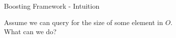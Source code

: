 \begin{frame}{Boosting Framework - Intuition}
    \begin{center}
        Assume we can query for the size of some element in $O$. 
        \\
        What can we do?
    \end{center}
\end{frame}